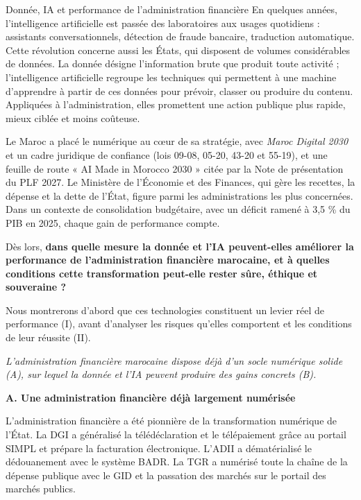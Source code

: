 \begin{copiemodele}{Donnée, IA et performance de l'administration financière}
En quelques années, l'intelligence artificielle est passée des laboratoires aux usages quotidiens : assistants conversationnels, détection de fraude bancaire, traduction automatique. Cette révolution concerne aussi les États, qui disposent de volumes considérables de données. La donnée désigne l'information brute que produit toute activité ; l'intelligence artificielle regroupe les techniques qui permettent à une machine d'apprendre à partir de ces données pour prévoir, classer ou produire du contenu. Appliquées à l'administration, elles promettent une action publique plus rapide, mieux ciblée et moins coûteuse.

Le Maroc a placé le numérique au cœur de sa stratégie, avec \textit{Maroc Digital 2030} et un cadre juridique de confiance (lois 09-08, 05-20, 43-20 et 55-19), et une feuille de route « AI Made in Morocco 2030 » citée par la Note de présentation du PLF 2027. Le Ministère de l'Économie et des Finances, qui gère les recettes, la dépense et la dette de l'État, figure parmi les administrations les plus concernées. Dans un contexte de consolidation budgétaire, avec un déficit ramené à 3,5 \% du PIB en 2025, chaque gain de performance compte.

Dès lors, \textbf{dans quelle mesure la donnée et l'IA peuvent-elles améliorer la performance de l'administration financière marocaine, et à quelles conditions cette transformation peut-elle rester sûre, éthique et souveraine ?}

Nous montrerons d'abord que ces technologies constituent un levier réel de performance (I), avant d'analyser les risques qu'elles comportent et les conditions de leur réussite (II).

\textit{L'administration financière marocaine dispose déjà d'un socle numérique solide (A), sur lequel la donnée et l'IA peuvent produire des gains concrets (B).}

\textbf{A. Une administration financière déjà largement numérisée}

L'administration financière a été pionnière de la transformation numérique de l'État. La DGI a généralisé la télédéclaration et le télépaiement grâce au portail SIMPL et prépare la facturation électronique. L'ADII a dématérialisé le dédouanement avec le système BADR. La TGR a numérisé toute la chaîne de la dépense publique avec le GID et la passation des marchés sur le portail des marchés publics.


\end{copiemodele}

